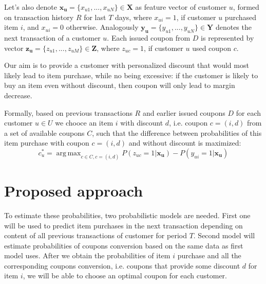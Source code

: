 \documentclass[12pt]{article}
\DeclareMathOperator*{\argmax}{arg\,max}
\begin{document}
Let's also denote $\mathbf{x_u} = \{x_{u1}, ..., x_{uN}\} \in \mathbf{X}$  as feature vector of customer $u$, formed on transaction history $R$ for last $T$ days, where $x_{ui} = 1$, if customer $u$ purchased item $i$, and $x_{ui} = 0$ otherwise. Analogously $\mathbf{y_u} = \{y_{u1}, ..., y_{uN}\} \in \mathbf{Y}$ denotes the next transaction of a customer $u$. Each issued coupon from $D$ is represented by vector $\mathbf{z_u} = \{z_{u1}, ..., z_{uM}\} \in \mathbf{Z}$, where $z_{uc} = 1$, if customer $u$ used coupon $c$. \par

Our aim is to provide a customer with personalized discount that would most likely lead to item purchase, while no being excessive: if the customer is likely to buy an item even without discount, then coupon will only lead to margin decrease. \par
 
Formally, based on previous transactions $R$ and earlier issued coupons $D$ for each customer $u \in U$ we chooce an item $i$ with discount $d$, i.e. coupon $c = (i, d)$ from a set of available coupons $C$, such that the difference between probabilities of this item purchase with coupon $c = (i, d)$ and without discount is maximized:
\begin{equation}
c_u^* = \argmax_{c \in C, c = (i, d)} P(z_{uc} = 1 | \mathbf{x_u}) - P(y_{ui} = 1 | \mathbf{x_u})
\end{equation}
\par

\section{Proposed approach}

To estimate these probabilities, two probabilistic models are needed. First one will be used to predict item purchases in the next transaction depending on content of all previous transactions of customer for period $T$. Second model will estimate probabilities of coupons conversion based on the same data as first model uses. After we obtain the probabilities of item $i$ purchase and all the corresponding coupons conversion, i.e. coupons that provide some discount $d$ for item $i$, we will be able to choose an optimal coupon for each customer. \par
\end{document}
